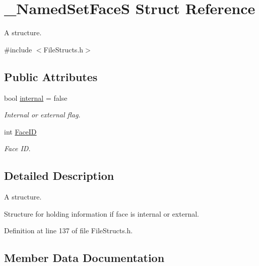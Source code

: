 \hypertarget{struct___named_set_face_s}{}\section{\+\_\+\+Named\+Set\+FaceS Struct Reference}
\label{struct___named_set_face_s}


A structure.  




{\ttfamily \#include $<$File\+Structs.\+h$>$}

\subsection*{Public Attributes}
\begin{DoxyCompactItemize}
\item 
bool \hyperlink{struct___named_set_face_s_ad89d075c31bb09b5d09a4f0ef1bcf3b1}{internal} = false
\begin{DoxyCompactList}\small\item\em Internal or external flag. \end{DoxyCompactList}\item 
int \hyperlink{struct___named_set_face_s_a39ab2efe31bd47d3b506c59fb9816911}{Face\+ID}\hypertarget{struct___named_set_face_s_a39ab2efe31bd47d3b506c59fb9816911}{}\label{struct___named_set_face_s_a39ab2efe31bd47d3b506c59fb9816911}

\begin{DoxyCompactList}\small\item\em Face ID. \end{DoxyCompactList}\end{DoxyCompactItemize}


\subsection{Detailed Description}
A structure. 

Structure for holding information if face is internal or external. 

Definition at line 137 of file File\+Structs.\+h.



\subsection{Member Data Documentation}
